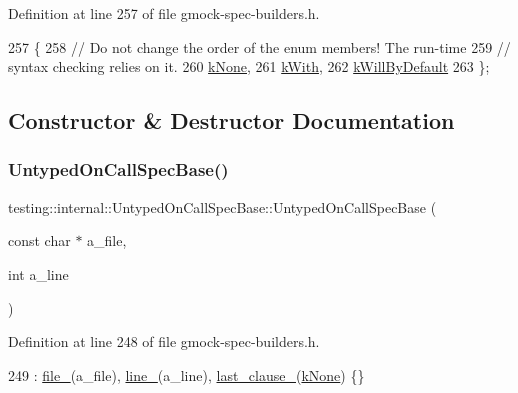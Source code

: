 Definition at line 257 of file gmock-\/spec-\/builders.\+h.


\begin{DoxyCode}
257               \{
258     \textcolor{comment}{// Do not change the order of the enum members!  The run-time}
259     \textcolor{comment}{// syntax checking relies on it.}
260     \hyperlink{classtesting_1_1internal_1_1UntypedOnCallSpecBase_a78ebf16bfee40375e33a983f3100f354a57f312c5eacf22518ff0b12405cde4f1}{kNone},
261     \hyperlink{classtesting_1_1internal_1_1UntypedOnCallSpecBase_a78ebf16bfee40375e33a983f3100f354a451699b0beaaabb325f8eaf1c65a071d}{kWith},
262     \hyperlink{classtesting_1_1internal_1_1UntypedOnCallSpecBase_a78ebf16bfee40375e33a983f3100f354aeb25a21e1aa3dc4ca3a108b5533d7eed}{kWillByDefault}
263   \};
\end{DoxyCode}


\subsection{Constructor \& Destructor Documentation}
\mbox{\label{classtesting_1_1internal_1_1UntypedOnCallSpecBase_afc5da72d536ad61e2d66de87b2b9bc50}} 
\subsubsection{\texorpdfstring{Untyped\+On\+Call\+Spec\+Base()}{UntypedOnCallSpecBase()}}
{\footnotesize\ttfamily testing\+::internal\+::\+Untyped\+On\+Call\+Spec\+Base\+::\+Untyped\+On\+Call\+Spec\+Base (\begin{DoxyParamCaption}\item[{const char $\ast$}]{a\+\_\+file,  }\item[{int}]{a\+\_\+line }\end{DoxyParamCaption})\hspace{0.3cm}{\ttfamily [inline]}}



Definition at line 248 of file gmock-\/spec-\/builders.\+h.


\begin{DoxyCode}
249       : \hyperlink{classtesting_1_1internal_1_1UntypedOnCallSpecBase_adf4e6c5022dfeb482f5328e9bb58ba88}{file\_}(a\_file), \hyperlink{classtesting_1_1internal_1_1UntypedOnCallSpecBase_a1dfa0dafaae6697f17adf5d837ca77c7}{line\_}(a\_line), \hyperlink{classtesting_1_1internal_1_1UntypedOnCallSpecBase_adb6d19adfeb5fde535d854aedbc5fb0f}{last\_clause\_}(\hyperlink{classtesting_1_1internal_1_1UntypedOnCallSpecBase_a78ebf16bfee40375e33a983f3100f354a57f312c5eacf22518ff0b12405cde4f1}{kNone}) \{\}
\end{DoxyCode}


